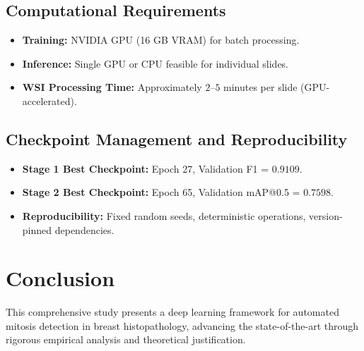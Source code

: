 \documentclass[journal]{IEEEtran}
\begin{document}
\subsection{Computational Requirements}
\begin{itemize}
\item \textbf{Training:} NVIDIA GPU (16 GB VRAM) for batch processing.
\item \textbf{Inference:} Single GPU or CPU feasible for individual slides.
\item \textbf{WSI Processing Time:} Approximately $2$--$5$ minutes per slide (GPU-accelerated).
\end{itemize}

\subsection{Checkpoint Management and Reproducibility}
\begin{itemize}
\item \textbf{Stage 1 Best Checkpoint:} Epoch 27, Validation F1 = $0.9109$.
\item \textbf{Stage 2 Best Checkpoint:} Epoch 65, Validation mAP@0.5 = $0.7598$.
\item \textbf{Reproducibility:} Fixed random seeds, deterministic operations, version-pinned dependencies.
\end{itemize}

\section{Conclusion}

This comprehensive study presents a deep learning framework for automated mitosis detection in breast histopathology, advancing the state-of-the-art through rigorous empirical analysis and theoretical justification.
\end{document}

